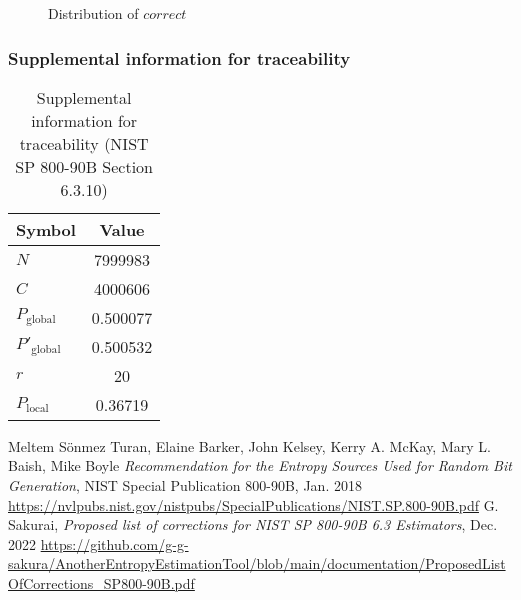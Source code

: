 \documentclass[a3paper,xelatex,english]{bxjsarticle}
\begin{document}
\begin{figure}[htbp]
\centering

\caption{Distribution of $correct$}
\end{figure}
\subsubsection{Supplemental information for traceability}
\renewcommand{\arraystretch}{1.8}
\begin{table}[h]
\caption{Supplemental information for traceability (NIST SP 800-90B Section 6.3.10)}
\begin{center}
\begin{tabular}{|l|c|}
\hline 
\rowcolor{anotherlightblue} %
Symbol				& Value \\ \hline 
$N$				& 7999983\\ \hline 
$C$				& 4000606\\ \hline 
$P_{\textrm{global}}$				& 0.500077\\ \hline 
$P'_{\textrm{global}}$			& 0.500532\\ \hline 
$r$				& 20\\ \hline 
$P_{\textrm{local}}$ 			&  0.36719\\ \hline
\end{tabular}
\end{center}
\end{table}
\renewcommand{\arraystretch}{1.4}
\begin{thebibliography}{99}
Meltem S\"{o}nmez Turan,
Elaine Barker,
John Kelsey,
Kerry A. McKay,
Mary L. Baish,
Mike Boyle
\textit{Recommendation for the Entropy Sources Used for Random Bit Generation},
NIST Special Publication 800-90B, Jan. 2018 
\url{https://nvlpubs.nist.gov/nistpubs/SpecialPublications/NIST.SP.800-90B.pdf}
G. Sakurai, \textit{Proposed list of corrections for NIST SP 800-90B 6.3 Estimators}, Dec. 2022 
\url{https://github.com/g-g-sakura/AnotherEntropyEstimationTool/blob/main/documentation/ProposedListOfCorrections_SP800-90B.pdf}
\end{thebibliography}
\end{document}

